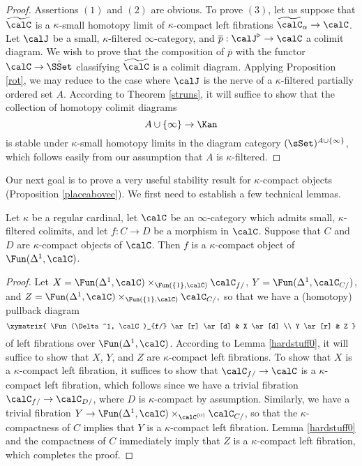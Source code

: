 \begin{proof}
Assertions $(1)$ and $(2)$ are obvious. To prove $(3)$, let us suppose that
$\widetilde{\calC}$ is a $\kappa$-small homotopy limit of $\kappa$-compact
left fibrations $\widetilde{\calC}_{\alpha} \rightarrow \calC$. Let
$\calJ$ be a small, $\kappa$-filtered $\infty$-category, and 
$\overline{p}: \calJ^{\triangleright} \rightarrow \calC$ a colimit diagram.
We wish to prove that the composition of $\overline{p}$ with the functor
$\calC \rightarrow \hat{\SSet}$ classifying $\widetilde{\calC}$ is a colimit diagram.
Applying Proposition \ref{rot}, we may reduce to the case where $\calJ$ is the nerve
of a $\kappa$-filtered partially ordered set $A$. According to Theorem \ref{struns},
it will suffice to show that the collection of homotopy colimit diagrams
$$ A \cup \{\infty \} \rightarrow \Kan$$
is stable under $\kappa$-small homotopy limits in the diagram category $(\sSet)^{A \cup \{\infty\} }$, which follows easily from our assumption that $A$ is $\kappa$-filtered.
\end{proof}

Our next goal is to prove a very useful stability result for $\kappa$-compact objects (Proposition \ref{placeabovee}). We first need to establish a few technical lemmas.

\begin{lemma}\label{hardstuff1}
Let $\kappa$ be a regular cardinal, let $\calC$ be an $\infty$-category which admits small, $\kappa$-filtered colimits, and let $f: C \rightarrow D$ be a morphism in $\calC$. Suppose that $C$ and $D$ are $\kappa$-compact objects of $\calC$. Then $f$ is a $\kappa$-compact object of
$\Fun(\Delta^1, \calC)$.
\end{lemma}

\begin{proof}
Let $X = \Fun(\Delta^1, \calC) \times_{ \Fun(\{1\}, \calC) } \calC_{f/}$,
$Y = \Fun(\Delta^1, \calC_{C/})$, and $Z = \Fun(\Delta^1, \calC) \times_{ \Fun(\{1\}, \calC) } \calC_{C/},$
so that we have a (homotopy) pullback diagram
$$ \xymatrix{ \Fun(\Delta^1, \calC)_{f/} \ar[r] \ar[d] & X \ar[d] \\
Y \ar[r] & Z }$$
of left fibrations over $\Fun(\Delta^1, \calC)$.
According to Lemma \ref{hardstuff0}, it will suffice to show that $X$, $Y$, and $Z$
are $\kappa$-compact left fibrations. To show that $X$ is a $\kappa$-compact left fibration, it suffices to show that $\calC_{f/} \rightarrow \calC$ is a $\kappa$-compact left fibration, which
follows since we have a trivial fibration $\calC_{f/} \rightarrow \calC_{D/}$, where $D$ is $\kappa$-compact by assumption. Similarly, we have a trivial fibration
$Y \rightarrow \Fun(\Delta^1, \calC) \times_{ \calC^{(0)}} \calC_{C/}$, so that the 
$\kappa$-compactness of $C$ implies that $Y$ is a $\kappa$-compact left fibration. Lemma \ref{hardstuff0} and the compactness of $C$ immediately imply that $Z$ is a $\kappa$-compact left fibration, which completes the proof.
\end{proof}

